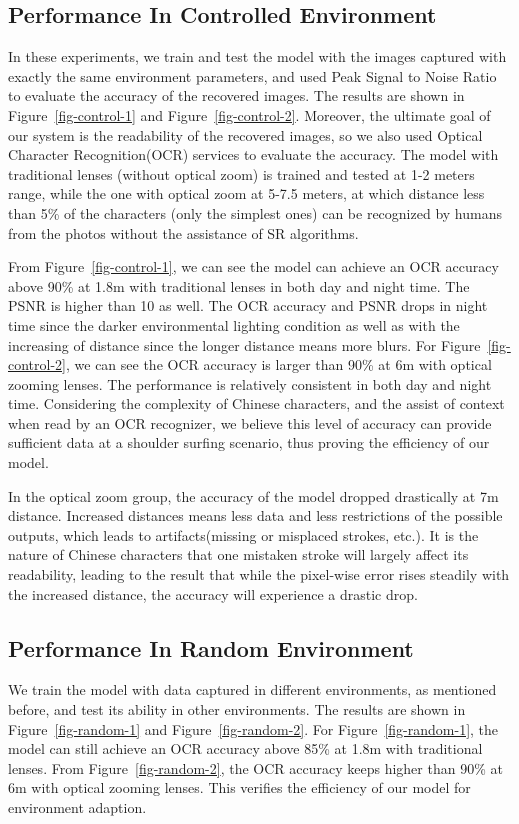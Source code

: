 \subsection{Performance In Controlled Environment}
In these experiments, we train and test the model with the images captured with exactly the same environment parameters, and used Peak Signal to Noise Ratio to evaluate the accuracy of the recovered images. The results are shown in Figure~\ref{fig-control-1} and Figure~\ref{fig-control-2}. Moreover, the ultimate goal of our system is the readability of the recovered images, so we also used Optical Character Recognition(OCR) services to evaluate the accuracy. The model with traditional lenses (without optical zoom) is trained and tested at 1-2 meters range, while the one with optical zoom at 5-7.5 meters, at which distance less than 5\% of the characters (only the simplest ones) can be recognized by humans from the photos without the assistance of SR algorithms. 

From Figure~\ref{fig-control-1}, we can see the model can achieve an OCR accuracy above 90\% at 1.8m with traditional lenses in both day and night time. The PSNR is higher than 10 as well. The OCR accuracy and PSNR drops in night time since the darker environmental lighting condition as well as with the increasing of distance since the longer distance means more blurs. For Figure~\ref{fig-control-2}, we can see the OCR accuracy is larger than 90\% at 6m with optical zooming lenses. The performance is relatively consistent in both day and night time. Considering the complexity of Chinese characters, and the assist of context when read by an OCR recognizer, we believe this level of accuracy can provide sufficient data at a shoulder surfing scenario, thus proving the efficiency of our model.

In the optical zoom group, the accuracy of the model dropped drastically at 7m distance. Increased distances means less data and less restrictions of the possible outputs, which leads to artifacts(missing or misplaced strokes, etc.). It is the nature of Chinese characters that one mistaken stroke will largely affect its readability, leading to the result that while the pixel-wise error rises steadily with the increased distance, the accuracy will experience a drastic drop.

\subsection{Performance In Random Environment}
We train the model with data captured in different environments, as mentioned before, and test its ability in other environments. The results are shown in Figure~\ref{fig-random-1} and Figure~\ref{fig-random-2}. For Figure~\ref{fig-random-1}, the model can still achieve an OCR accuracy above 85\% at 1.8m with traditional lenses. From Figure~\ref{fig-random-2}, the OCR accuracy keeps higher than 90\% at 6m with optical zooming lenses. This verifies the efficiency of our model for environment adaption.
 
